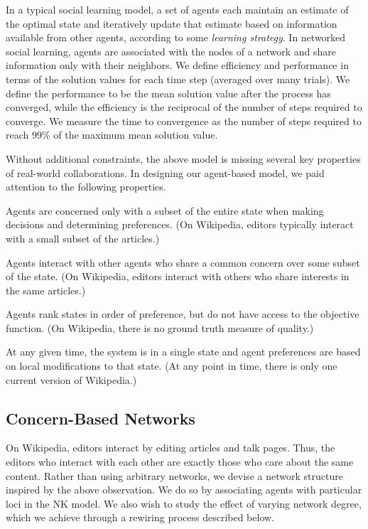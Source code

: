\documentclass[letterpaper,twocolumn,10pt]{article}
\newcommand{\+}{\phantom{-}}
\begin{document}
In a typical social learning model,
a set of agents each maintain an estimate of the optimal state
and iteratively update that estimate based on information available from other agents,
according to some {\em learning strategy}.
In networked social learning,
agents are associated with the nodes of a network and share information
only with their neighbors.
We define efficiency and performance in terms of the solution values for each time step
(averaged over many trials).
We define the performance to be the mean solution value after the process has converged,
while the efficiency is the reciprocal of the number of steps required to converge.
We measure the time to convergence as the number of steps required to reach 99\% of the maximum
mean solution value.

Without additional constraints,
the above model is missing
several key properties of real-world collaborations.
In designing our agent-based model, we paid attention to the
following properties.
\begin{description}
\setlength\itemsep{0pt}
\item[Limited concern.] Agents are concerned only with a subset of the entire
state when making decisions and determining preferences.
(On Wikipedia, editors typically interact with a small subset of the articles.)
\item[Concern-based network.] Agents interact with other agents who share a
common concern over some subset of the state.
(On Wikipedia, editors interact with others who share interests in the same articles.)
\item[Unknown objective.] Agents rank states in order of preference,
but do not have access to the objective function.
(On Wikipedia, there is no ground truth measure of quality.)
\item[Single source of truth.] At any given time, the system is in a single state
and agent preferences are based on local modifications to that state.
(At any point in time, there is only one current version of Wikipedia.)
\end{description}

\subsection{Concern-Based Networks}

On Wikipedia, editors interact by editing articles and talk pages.
Thus, the editors who interact with each other are exactly those who care about the same content.
Rather than using arbitrary networks,
we devise a network structure inspired by the above observation.
We do so by associating agents with particular loci in the NK model.
We also wish to study the effect of varying network degree,
which we achieve through a rewiring process described below.
\end{document}
